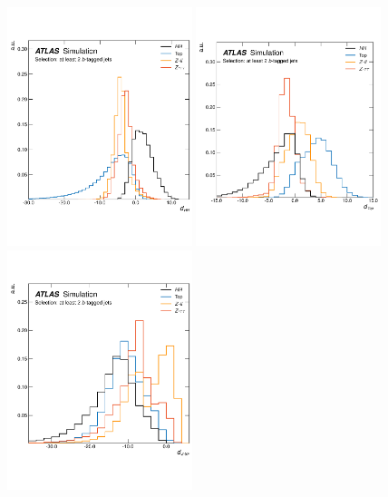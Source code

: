 \begin{figure}[!htb]
    \begin{center}
        \includegraphics[width=0.48\textwidth]{figures/search_hh/nn_disc/pi_plot_NN_d_hh}
        \includegraphics[width=0.48\textwidth]{figures/search_hh/nn_disc/pi_plot_NN_d_top}
        \includegraphics[width=0.48\textwidth]{figures/search_hh/nn_disc/pi_plot_NN_d_zsf}

\end{center}
\end{figure}
